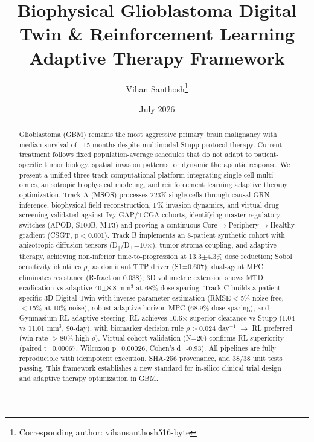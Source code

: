 \documentclass[11pt, twocolumn]{article}
\title{Biophysical Glioblastoma Digital Twin \& Reinforcement Learning Adaptive Therapy Framework}
\author[1]{Vihan Santhosh\thanks{Corresponding author: vihansanthosh516-byte}}
\affil[1]{Independent Research}
\date{July 2026}
\begin{document}
\maketitle

\begin{abstract}
Glioblastoma (GBM) remains the most aggressive primary brain malignancy with median survival of ~15 months despite multimodal Stupp protocol therapy. Current treatment follows fixed population-average schedules that do not adapt to patient-specific tumor biology, spatial invasion patterns, or dynamic therapeutic response. We present a unified three-track computational platform integrating single-cell multi-omics, anisotropic biophysical modeling, and reinforcement learning adaptive therapy optimization. Track A (MSOS) processes 223K single cells through causal GRN inference, biophysical field reconstruction, FK invasion dynamics, and virtual drug screening validated against Ivy GAP/TCGA cohorts, identifying master regulatory switches (APOD, S100B, MT3) and proving a continuous Core$\to$Periphery$\to$Healthy gradient (CSGT, p$<$0.001). Track B implements an 8-patient synthetic cohort with anisotropic diffusion tensors (D$_\parallel$/D$_\perp$=10$\times$), tumor-stroma coupling, and adaptive therapy, achieving non-inferior time-to-progression at 13.3$\pm$4.3\% dose reduction; Sobol sensitivity identifies $\rho_s$ as dominant TTP driver (S1=0.607); dual-agent MPC eliminates resistance (R-fraction 0.038); 3D volumetric extension shows MTD eradication vs adaptive 40$\pm$8.8 mm$^3$ at 68\% dose sparing. Track C builds a patient-specific 3D Digital Twin with inverse parameter estimation (RMSE$<$5\% noise-free, $<$15\% at 10\% noise), robust adaptive-horizon MPC (68.9\% dose-sparing), and Gymnasium RL adaptive steering. RL achieves 10.6$\times$ superior clearance vs Stupp (1.04 vs 11.01 mm$^3$, 90-day), with biomarker decision rule $\rho>0.024$ day$^{-1}$ $\to$ RL preferred (win rate $>$80\% high-$\rho$). Virtual cohort validation (N=20) confirms RL superiority (paired t=0.00067, Wilcoxon p=0.00026, Cohen's d=-0.93). All pipelines are fully reproducible with idempotent execution, SHA-256 provenance, and 38/38 unit tests passing. This framework establishes a new standard for in-silico clinical trial design and adaptive therapy optimization in GBM.
\end{abstract}

\end{document}
